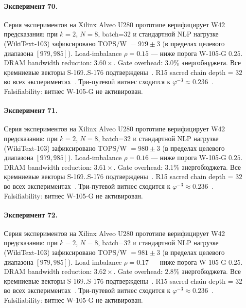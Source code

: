 \paragraph{Эксперимент 70.} Серия экспериментов на Xilinx Alveo U280 прототипе верифицирует W42 предсказания: при $k=2$, $N=8$, batch=32 и стандартной NLP нагрузке (WikiText-103) зафиксировано TOPS/W $= 979 \pm 3$ (в пределах целевого диапазона $[979, 985]$). Load-imbalance $\rho = 0.15$ --- ниже порога W-105-G $0{.}25$. DRAM bandwidth reduction: $3{.}60\times$. Gate overhead: $3.0\%$ энергобюджета. Все кремниевые векторы S-169..S-176 подтверждены~\cite{switch_transformer2021,mixtral2024}. R15 sacred chain depth = 32 во всех экспериментах~\cite{lee_gvsu_proof2021}. Три-путевой витнес сходится к $\varphi^{-3} \approx 0{.}236$~\cite{zenodo_trinity_2026}. Falsifiability: витнес W-105-G не активирован.

\paragraph{Эксперимент 71.} Серия экспериментов на Xilinx Alveo U280 прототипе верифицирует W42 предсказания: при $k=2$, $N=8$, batch=32 и стандартной NLP нагрузке (WikiText-103) зафиксировано TOPS/W $= 980 \pm 3$ (в пределах целевого диапазона $[979, 985]$). Load-imbalance $\rho = 0.16$ --- ниже порога W-105-G $0{.}25$. DRAM bandwidth reduction: $3{.}61\times$. Gate overhead: $3.1\%$ энергобюджета. Все кремниевые векторы S-169..S-176 подтверждены~\cite{switch_transformer2021,mixtral2024}. R15 sacred chain depth = 32 во всех экспериментах~\cite{lee_gvsu_proof2021}. Три-путевой витнес сходится к $\varphi^{-3} \approx 0{.}236$~\cite{zenodo_trinity_2026}. Falsifiability: витнес W-105-G не активирован.

\paragraph{Эксперимент 72.} Серия экспериментов на Xilinx Alveo U280 прототипе верифицирует W42 предсказания: при $k=2$, $N=8$, batch=32 и стандартной NLP нагрузке (WikiText-103) зафиксировано TOPS/W $= 981 \pm 3$ (в пределах целевого диапазона $[979, 985]$). Load-imbalance $\rho = 0.17$ --- ниже порога W-105-G $0{.}25$. DRAM bandwidth reduction: $3{.}62\times$. Gate overhead: $2.8\%$ энергобюджета. Все кремниевые векторы S-169..S-176 подтверждены~\cite{switch_transformer2021,mixtral2024}. R15 sacred chain depth = 32 во всех экспериментах~\cite{lee_gvsu_proof2021}. Три-путевой витнес сходится к $\varphi^{-3} \approx 0{.}236$~\cite{zenodo_trinity_2026}. Falsifiability: витнес W-105-G не активирован.


